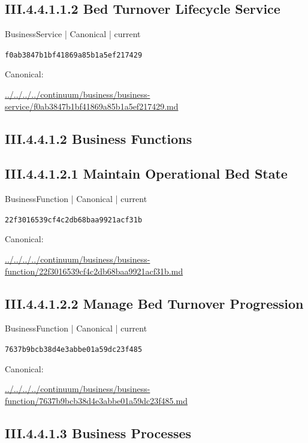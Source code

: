\documentclass[10pt,a4paper]{article}
\begin{document}
\subsection*{III.4.4.1.1.2 Bed Turnover Lifecycle Service}
\label{element-f0ab3847b1bf41869a85b1a5ef217429}
{\small BusinessService | Canonical | current}\par
\texttt{f0ab3847b1bf41869a85b1a5ef217429}\par
Canonical: \par
{\footnotesize\url{../../../../continuum/business/business-service/f0ab3847b1bf41869a85b1a5ef217429.md}}\par
\subsection*{III.4.4.1.2 Business Functions}
\subsection*{III.4.4.1.2.1 Maintain Operational Bed State}
\label{element-22f3016539cf4c2db68baa9921acf31b}
{\small BusinessFunction | Canonical | current}\par
\texttt{22f3016539cf4c2db68baa9921acf31b}\par
Canonical: \par
{\footnotesize\url{../../../../continuum/business/business-function/22f3016539cf4c2db68baa9921acf31b.md}}\par
\subsection*{III.4.4.1.2.2 Manage Bed Turnover Progression}
\label{element-7637b9bcb38d4e3abbe01a59dc23f485}
{\small BusinessFunction | Canonical | current}\par
\texttt{7637b9bcb38d4e3abbe01a59dc23f485}\par
Canonical: \par
{\footnotesize\url{../../../../continuum/business/business-function/7637b9bcb38d4e3abbe01a59dc23f485.md}}\par
\subsection*{III.4.4.1.3 Business Processes}
\end{document}
